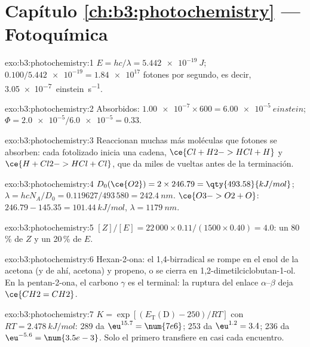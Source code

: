 \section*{Capítulo \ref{ch:b3:photochemistry} --- Fotoquímica}

\begin{solution}{exo:b3:photochemistry:1}
$E = hc/\lambda = \qty{5.442e-19}{J}$; $0.100/\num{5.442e-19} = \num{1.84e17}$ fotones por segundo, es decir,
\qty{3.05e-7}{einstein.s^{-1}}.
\end{solution}

\begin{solution}{exo:b3:photochemistry:2}
Absorbidos: $\num{1.00e-7} \times 600 = \qty{6.00e-5}{einstein}$; $\Phi = \num{2.0e-5}/\num{6.0e-5} = 0.33$.
\end{solution}

\begin{solution}{exo:b3:photochemistry:3}
Reaccionan muchas más moléculas que fotones se absorben: cada  fotolizado inicia una
cadena, $\ce{Cl + H2 -> HCl + H}$ y $\ce{H + Cl2 -> HCl + Cl}$, que da miles de vueltas antes de la
terminación.
\end{solution}

\begin{solution}{exo:b3:photochemistry:4}
$D_0(\ce{O2}) = 2 \times 246.79 = \qty{493.58}{kJ/mol}$; $\lambda = hcN_A/D_0 = 0.119627/493\,580 =
\qty{242.4}{nm}$. $\ce{O3 -> O2 + O}$: $246.79 - 145.35 = \qty{101.44}{kJ/mol}$, $\lambda = \qty{1179}{nm}$.
\end{solution}

\begin{solution}{exo:b3:photochemistry:5}
$[Z]/[E] = 22\,000 \times 0.11/(1500 \times 0.40) = 4.0$: un 80\,\% de $Z$ y un 20\,\% de $E$.
\end{solution}

\begin{solution}{exo:b3:photochemistry:6}
Hexan-2-ona: el 1,4-birradical se rompe en el enol de la acetona (y de ahí, acetona) y
propeno, o se cierra en 1,2-dimetilciclobutan-1-ol. En la pentan-2-ona, el carbono $\gamma$
es el  terminal: la ruptura del enlace $\alpha$--$\beta$ deja $\ce{CH2=CH2}$.
\end{solution}

\begin{solution}{exo:b3:photochemistry:7}
$K = \exp[(E_{\mathrm T}(\mathrm D) - 250)/RT]$ con $RT = \qty{2.478}{kJ/mol}$: 289 da $\eu^{15.7} = \num{7e6}$;
253 da $\eu^{1.2} = 3.4$; 236 da $\eu^{-5.6} = \num{3.5e-3}$. Solo el primero transfiere en casi
cada encuentro.
\end{solution}

